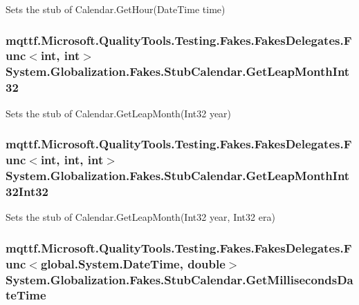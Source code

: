 Sets the stub of Calendar.\-Get\-Hour(\-Date\-Time time)

\hypertarget{class_system_1_1_globalization_1_1_fakes_1_1_stub_calendar_a7bcd2d407dc0cfa19e541f8bfe2b3d1f}{
\subsubsection[{Get\-Leap\-Month\-Int32}]{\setlength{\rightskip}{0pt plus 5cm}mqttf.\-Microsoft.\-Quality\-Tools.\-Testing.\-Fakes.\-Fakes\-Delegates.\-Func$<$int, int$>$ System.\-Globalization.\-Fakes.\-Stub\-Calendar.\-Get\-Leap\-Month\-Int32}}\label{class_system_1_1_globalization_1_1_fakes_1_1_stub_calendar_a7bcd2d407dc0cfa19e541f8bfe2b3d1f}


Sets the stub of Calendar.\-Get\-Leap\-Month(\-Int32 year)

\hypertarget{class_system_1_1_globalization_1_1_fakes_1_1_stub_calendar_a98bd3c40e433d9cc12bbc106c52d6e18}{
\subsubsection[{Get\-Leap\-Month\-Int32\-Int32}]{\setlength{\rightskip}{0pt plus 5cm}mqttf.\-Microsoft.\-Quality\-Tools.\-Testing.\-Fakes.\-Fakes\-Delegates.\-Func$<$int, int, int$>$ System.\-Globalization.\-Fakes.\-Stub\-Calendar.\-Get\-Leap\-Month\-Int32\-Int32}}\label{class_system_1_1_globalization_1_1_fakes_1_1_stub_calendar_a98bd3c40e433d9cc12bbc106c52d6e18}


Sets the stub of Calendar.\-Get\-Leap\-Month(\-Int32 year, Int32 era)

\hypertarget{class_system_1_1_globalization_1_1_fakes_1_1_stub_calendar_a64ac852eef1d8137e24029d3e3363920}{
\subsubsection[{Get\-Milliseconds\-Date\-Time}]{\setlength{\rightskip}{0pt plus 5cm}mqttf.\-Microsoft.\-Quality\-Tools.\-Testing.\-Fakes.\-Fakes\-Delegates.\-Func$<$global.\-System.\-Date\-Time, double$>$ System.\-Globalization.\-Fakes.\-Stub\-Calendar.\-Get\-Milliseconds\-Date\-Time}}\label{class_system_1_1_globalization_1_1_fakes_1_1_stub_calendar_a64ac852eef1d8137e24029d3e3363920}


